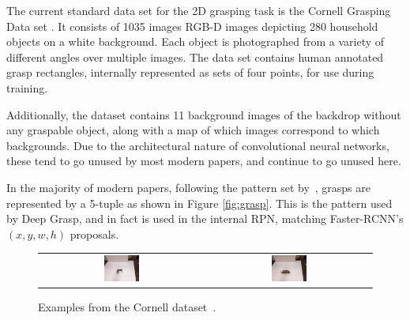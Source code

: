\documentclass[10pt,twocolumn,letterpaper]{article}
\begin{document}
The current standard data set for the 2D grasping task is the Cornell Grasping Data set \cite{cornelldataset}. It consists of 1035 images RGB-D images depicting 280 household objects on a white background. Each object is photographed from a variety of different angles over multiple images. The data set contains human annotated grasp rectangles, internally represented as sets of four points, for use during training.

Additionally, the dataset contains 11 background images of the backdrop without any graspable object, along with a map of which images correspond to which backgrounds. Due to the architectural nature of convolutional neural networks, these tend to go unused by most modern papers, and continue to go unused here.

In the majority of modern papers, following the pattern set by~\cite{redmon14}, grasps are represented by a 5-tuple as shown in Figure \ref{fig:grasp}. This is the pattern used by Deep Grasp, and in fact is used in the internal RPN, matching Faster-RCNN's $(x, y, w, h)$ proposals. 


\begin{figure}
    \centering
    
\begin{tabular}{cc}

	  \includegraphics[width=0.22\textwidth]{images/googles.png} & 
\includegraphics[width=0.22\textwidth]{images/shoe.png} \\

\end{tabular}

    \caption{Examples from the Cornell dataset~\cite{cornelldataset}.}
\end{figure}
\end{document}
